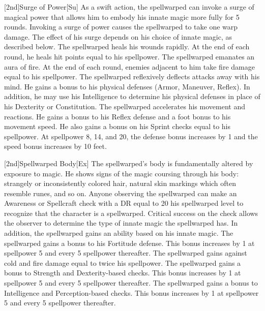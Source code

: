         [2nd]{Surge of Power}[Su]
        As a swift action, the spellwarped can invoke a surge of magical power that allows him to embody his innate magic more fully for 5 rounds.
        Invoking a surge of power causes the spellwarped to take one warp damage.
        The effect of his surge depends on his choice of innate magic, as described below.
        The spellwarped heals his wounds rapidly.
        At the end of each round, he heals hit points equal to his spellpower.
        The spellwarped emanates an aura of fire.
        At the end of each round, enemies adjacent to him take fire damage equal to his spellpower.
        The spellwarped reflexively deflects attacks away with his mind.
        He gains a  bonus to his physical defenses (Armor, Maneuver, Reflex).
        In addition, he may use his Intelligence to determine his physical defenses in place of his Dexterity or Constitution.
        The spellwarped accelerates his movement and reactions.
        He gains a  bonus to his Reflex defense and a  foot bonus to his movement speed.
        He also gains a bonus on his Sprint checks equal to his spellpower.
        At spellpower 8, 14, and 20, the defense bonus increases by 1 and the speed bonus increases by 10 feet.

        [2nd]{Spellwarped Body}[Ex]
        The spellwarped's body is fundamentally altered by exposure to magic.
        He shows signs of the magic coursing through his body: strangely or inconsistently colored hair, natural skin markings which often resemble runes, and so on.
        Anyone observing the spellwarped can make an Awareness or Spellcraft check with a DR equal to 20 \sub his spellwarped level to recognize that the character is a spellwarped.
        Critical success on the check allows the observer to determine the type of innate magic the spellwarped has.
        In addition, the spellwarped gains an ability based on his innate magic.
        The spellwarped gains a  bonus to his Fortitude defense.
        This bonus increases by 1 at spellpower 5 and every 5 spellpower thereafter.
        The spellwarped gains  against cold and fire damage equal to twice his spellpower.
        The spellwarped gains a  bonus to Strength and Dexterity-based checks.
        This bonus increases by 1 at spellpower 5 and every 5 spellpower thereafter.
        The spellwarped gains a  bonus to Intelligence and Perception-based checks.
        This bonus increases by 1 at spellpower 5 and every 5 spellpower thereafter.

